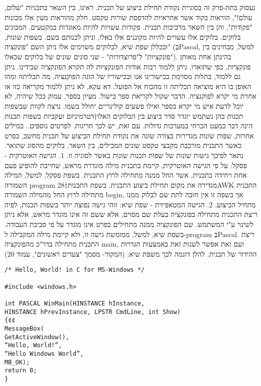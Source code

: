 נעסוק בתת-פרק זה בסוגיית נקודת תחילת ביצוע של תכנית.
    ראינו, בין השאר בתכניות "שלום, עולם!", הוראות בקוד אשר אחראיות להדפסת שורות טקסט. חלק מהוראות מעין אלו מכונות "פקודות", והן בין השאר מרכיבות תכנית. פקודות עשויות להיות מאוגדות במקטעים, המכונים בלוקים. בלוקים אלו עשויים להיות מקוננים אלו באלו, וניתן לכנותם בשם. בשפות שונות, ובכללן שפת שיא, לבלוקים משוימים אלו ניתן השם "פונקציה" (בְּPascal, למשל, מבחינים בין "פונקציות" ל"פרוצדורות" - שני סוגים שונים של בלוקים שכאלו).
    בהינתן אחת מאותן פונקציות, כפי שתוארו, ניתן ללמוד רבות אודות הפונקציות לה תקרא הפונקציה שבידינו. ניתן גם ללמוד, בתלות מסוימת בכישורינו אנו ובכישוריו של הוגה הפוקנציה, מה תכליתה ומהו האופן בו היא מוציאה תכליתה זו מהכוח אל הפועל. דא עקא, לא ניתן ללמוד מקריאה כזו או אחרת מי יקרא לפוקנציה. הדבר שקול לקריאת ספר בישול. מעיון בספר, עמוק ככל שיהיה, לא יוכל לדעת איש מי יקרא בספר ואילו פשעים קולינריים יחולל בשמו.
    נרצה לקוות שבשפות תכנות בהן נשתמש יוגדר סדר ביצוע בין הבלוקים האלו†{דטרמיניזם ועקביות בשפות תכנות הינה דבר כמעט הכרחי במערכות גדולות. עם זאת, יש לכך חריגות. לפרטים נוספים.}. במילים אחרות, שפות שונות מגדירות בצורה שונה את נקודת תחילת הביצוע של תכנית מחשב, בפרט כאשר התכנית מורכבת מקבצי טקסט שונים המכילים, בין השאר, בלוקים מהסוג שתואר. נתאר לפיכך גישות שונות של שפות תכנות שונות באשר לסוגיה זו.
    1. הגישה האוטרקית - פסקל: על פי הגישה האוטרקית, קיימת בתכנית מילה מוגדרת מראש, שחייבת להופיע פעם אחת ויחידה בתכנית, אשר החל ממנה מתחילה לרוץ התכנית. בשפת פסקל, למשל, המילה השמורה program מגדירה את מקום תחילת ביצוע התכנית. בשפת התכנות†{28}AWK התכנית מתחילה לרוץ החל מהמילה השמורה begin, אך בשפה זו אין חובה לתת שם לבלוק ממנו מתחיל הביצוע.
    2. הגישה המטאפיזית - שפת שיא: זוהי גישה נפוצה יותר בשפות תכנות, לפיה ריצת התכנית מתחילה בפונקציה בעלת שם מסוים, אלא ששם זה אינו מוגדר מראש, אלא ניתן לשינוי ע"י המשתמש. שם הפונקציה ממנה מתחילים
    בפרט אינו מוגדר על פי סביבת העבודה. בשפת שיא, למשל, ממומשת גישה זו, ולא קיימת מילה המקבילה
    ל-program בְּPascal. ריצת התכנית מתחילה בדר"כ מהפונקציה main, ועם זאת אפשר לשנות זאת באמצעות
    הגדרות ההידור של תכנית. להלן דוגמה לכך משפת שיא: (המקור- מסמך "צעדים ראשונים", עמוד 20)
    


   

    \begin{verbatim}
/* Hello, World! in C for MS-Windows */

#include <windows.h>

int PASCAL WinMain(HINSTANCE hInstance,
HINSTANCE hPrevInstance, LPSTR CmdLine, int Show)
{¢¢
MessageBox(
GetActiveWindow(),
“Hello, World!”,
“Hello Windows World”,
MB_OK);
return 0;
}
\end{verbatim}
    
